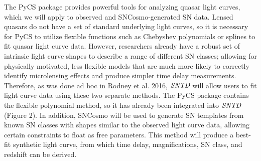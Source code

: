 The PyCS package provides powerful tools for analyzing quasar light curves, which we will apply to observed and SNCosmo-generated SN data. Lensed quasars do not have a set of standard underlying light curves, so it is necessary for PyCS to utilize flexible functions such as Chebyshev polynomials or splines to fit quasar light curve data. However, researchers already have a robust set of intrinsic light curve shapes to describe a range of different SN classes; allowing for physically motivated, less flexible models that are much more likely to correctly identify microlensing effects and produce simpler time delay measurements. Therefore, as was done ad hoc in Rodney et al. 2016, $\textit{SNTD}$ will allow users to fit light curve data using these two separate methods. The PyCS package contains the flexible polynomial method, so it has already been integrated into $\textit{SNTD}$ (Figure 2). In addition, SNCosmo will be used to generate SN templates from known SN classes with shapes similar to the observed light curve data, allowing certain constraints to float as free parameters. This method will produce a best-fit synthetic light curve, from which time delay, magnifications, SN class, and redshift can be derived. 
